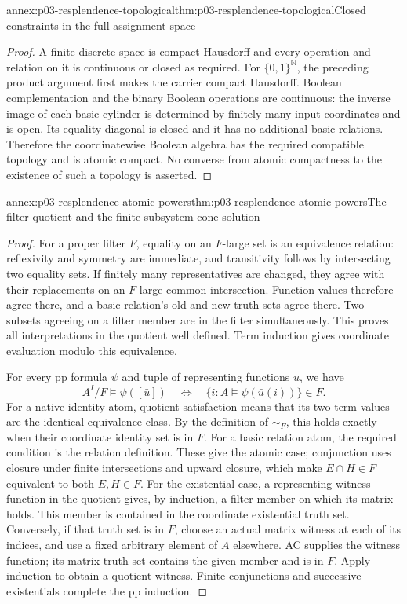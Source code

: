 \begin{annexitem}{annex:p03-resplendence-topological}{thm:p03-resplendence-topological}{Closed constraints in the full assignment space}
\begin{proof}
A finite discrete space is compact Hausdorff and every operation and
relation on it is continuous or closed as required. For
\(\{0,1\}^{\mathbb N}\), the preceding product argument first makes
the carrier compact Hausdorff. Boolean complementation and the binary
Boolean operations are continuous: the inverse image of each basic cylinder
is determined by finitely many input coordinates and is open. Its equality
diagonal is closed and it has no additional basic relations. Therefore the
coordinatewise Boolean algebra has the required compatible topology and
is atomic compact. No converse from atomic compactness to the existence
of such a topology is asserted.
\end{proof}
\end{annexitem}

\begin{annexitem}{annex:p03-resplendence-atomic-powers}{thm:p03-resplendence-atomic-powers}{The filter quotient and the finite-subsystem cone solution}
\begin{proof}
For a proper filter \(F\), equality on an \(F\)-large set is an
equivalence relation: reflexivity and symmetry are immediate, and
transitivity follows by intersecting two equality sets. If finitely many
representatives are changed, they agree with their replacements on an
\(F\)-large common intersection. Function values therefore agree there,
and a basic relation's old and new truth sets agree there. Two subsets
agreeing on a filter member are in the filter simultaneously. This proves
all interpretations in the quotient well defined. Term induction gives
coordinate evaluation modulo this equivalence.

For every pp formula \(\psi\) and tuple of representing functions
\(\bar u\), we have
\[
 A^I/F\models\psi([\bar u])
 \quad\Longleftrightarrow\quad
 \{i:A\models\psi(\bar u(i))\}\in F.
\]
For a native identity atom, quotient satisfaction means that its two term
values are the identical equivalence class. By the definition of
\(\sim_F\), this holds exactly when their coordinate identity set is
in \(F\). For a basic relation atom, the required condition is the
relation definition. These give the atomic case; conjunction
uses closure under finite intersections and upward closure, which make
\(E\cap H\in F\) equivalent to both \(E,H\in F\). For the
existential case, a representing witness function in the quotient gives,
by induction, a filter member on which its matrix holds. This member is
contained in the coordinate existential truth set. Conversely, if that
truth set is in \(F\), choose an actual matrix witness at each of its
indices, and use a fixed arbitrary element of \(A\) elsewhere. AC supplies
the witness function; its matrix truth set contains the given member and
is in \(F\). Apply induction to obtain a quotient witness. Finite
conjunctions and successive existentials complete the pp induction.


\end{proof}
\end{annexitem}
